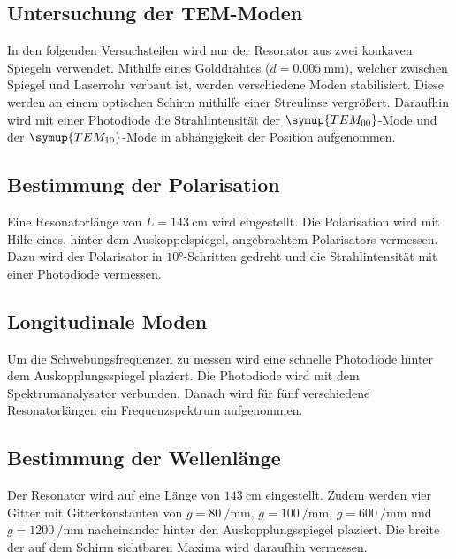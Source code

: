 \subsection{Untersuchung der TEM-Moden}
In den folgenden Versuchsteilen wird nur der Resonator aus zwei konkaven Spiegeln verwendet.
Mithilfe eines Golddrahtes ($d = \SI{0.005}{\milli\meter}$), welcher zwischen Spiegel und Laserrohr verbaut ist,
werden verschiedene Moden stabilisiert. Diese werden an einem optischen Schirm mithilfe einer Streulinse vergrößert.
Daraufhin wird mit einer Photodiode die Strahlintensität der $\symup{TEM_{00}}$-Mode und der $\symup{TEM_{10}}$-Mode in abhängigkeit der Position aufgenommen.

\subsection{Bestimmung der Polarisation}
Eine Resonatorlänge von $L = \SI{143}{\centi\meter}$ wird eingestellt.
Die Polarisation wird mit Hilfe eines, hinter dem Auskoppelspiegel, angebrachtem Polarisators vermessen. 
Dazu wird der Polarisator in $\ang{10}$-Schritten gedreht und die Strahlintensität mit einer Photodiode vermessen.

\subsection{Longitudinale Moden}
Um die Schwebungsfrequenzen zu messen wird eine schnelle Photodiode hinter dem Auskopplungsspiegel plaziert.
Die Photodiode wird mit dem Spektrumanalysator verbunden.
Danach wird für fünf verschiedene Resonatorlängen ein Frequenzspektrum aufgenommen.

\subsection{Bestimmung der Wellenlänge}
Der Resonator wird auf eine Länge von $\SI{143}{\centi\meter}$ eingestellt.
Zudem werden vier Gitter mit Gitterkonstanten von $g = \SI{80}{\per\milli\meter}$, 
$g = \SI{100}{\per\milli\meter}$, $g = \SI{600}{\per\milli\meter}$ und $g = \SI{1200}{\per\milli\meter}$
nacheinander hinter den Auskopplungsspiegel plaziert. 
Die breite der auf dem Schirm sichtbaren Maxima wird daraufhin vermessen.
